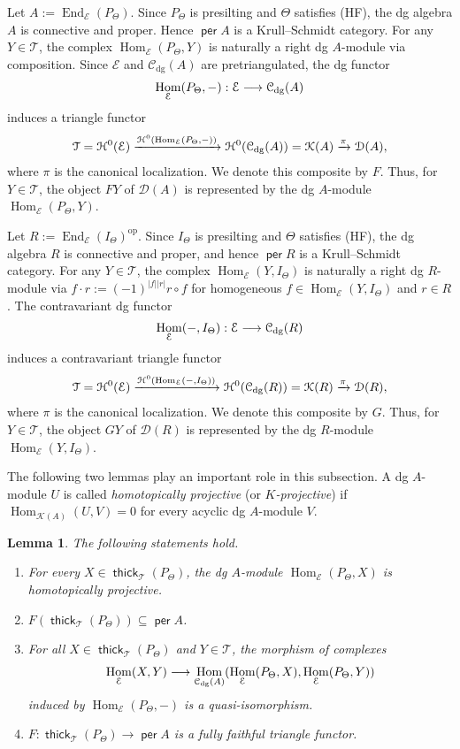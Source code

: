 \documentclass[a4paper,reqno,11pt]{amsart}
\numberwithin{equation}{section}
\newtheorem{lemma}[theorem]{Lemma}
\theoremstyle{definition}
\newcommand{\C}{\mathcal{C}}
\newcommand{\D}{\mathcal{D}}
\newcommand{\E}{\mathcal{E}}
\renewcommand{\H}{\mathcal{H}}
\newcommand{\K}{\mathcal{K}}
\newcommand{\T}{\mathcal{T}}
\newcommand{\bte}{\Theta}
\newcommand{\lto}{\longrightarrow}
\newcommand{\op}{\mathrm{op}}
\DeclareMathOperator{\thick}{\mathsf{thick}}
\DeclareMathOperator{\per}{\mathsf{per}}
\DeclareMathOperator{\End}{End}
\DeclareMathOperator{\Hom}{Hom}
\newcommand{\dgmod}{\C_{\mathrm{dg}}}
\begin{document}
Let $A:=\End_{\E}(P_{\bte})$.
Since $P_{\bte}$ is presilting and $\bte$ satisfies (HF), the dg algebra $A$ is connective and proper.
Hence $\per A$ is a Krull--Schmidt category.
For any $Y\in\T$, the complex $\Hom_{\E}(P_{\bte},Y)$ is naturally a right dg $A$-module via composition.
Since $\E$ and $\dgmod(A)$ are pretriangulated, the dg functor
\begin{align}
\Hom_{\E}(P_{\bte},-):\E\longrightarrow\dgmod(A)\notag
\end{align}
induces a triangle functor
\begin{align}
\T=\H^{0}(\E) \xrightarrow{\H^{0}(\Hom_{\E}(P_{\bte},-))} \H^{0}(\dgmod(A))=\K(A)\xrightarrow{\pi}\D(A),\notag
\end{align}
where $\pi$ is the canonical localization.
We denote this composite by $F$.
Thus, for $Y\in\T$, the object $FY$ of $\D(A)$ is represented by the dg $A$-module $\Hom_{\E}(P_{\bte},Y)$.

Let $R:=\End_{\E}(I_{\bte})^{\op}$.
Since $I_{\bte}$ is presilting and $\bte$ satisfies (HF), the dg algebra $R$ is connective and proper, and hence $\per R$ is a Krull--Schmidt category.
For any $Y\in\T$, the complex $\Hom_{\E}(Y,I_{\bte})$ is naturally a right dg $R$-module via $f\cdot r:=(-1)^{|f||r|}r\circ f$ for homogeneous $f\in\Hom_{\E}(Y,I_{\bte})$ and $r\in R$.
The contravariant dg functor
\begin{align}
\Hom_{\E}(-,I_{\bte}):\E\longrightarrow\dgmod(R)\notag
\end{align}
induces a contravariant triangle functor
\begin{align}
\T=\H^{0}(\E) \xrightarrow{\H^{0}(\Hom_{\E}(-,I_{\bte}))} \H^{0}(\dgmod(R))=\K(R)\xrightarrow{\pi}\D(R),\notag
\end{align}
where $\pi$ is the canonical localization.
We denote this composite by $G$.
Thus, for $Y\in\T$, the object $GY$ of $\D(R)$ is represented by the dg $R$-module $\Hom_{\E}(Y,I_{\bte})$.

The following two lemmas play an important role in this subsection.
A dg $A$-module $U$ is called \emph{homotopically projective} (or \emph{$K$-projective}) if $\Hom_{\K(A)}(U,V)=0$ for every acyclic dg $A$-module $V$.

\begin{lemma}\label{lem:Yoneda}
The following statements hold.
\begin{enumerate}
\item For every $X\in\thick_{\T}(P_{\bte})$, the dg $A$-module $\Hom_{\E}(P_{\bte},X)$ is homotopically projective.
\item $F(\thick_{\T}(P_{\bte}))\subseteq\per A$.
\item For all $X\in\thick_{\T}(P_{\bte})$ and $Y\in\T$, the morphism of complexes
\begin{align}
\Hom_{\E}(X,Y)\lto\Hom_{\dgmod(A)}(\Hom_{\E}(P_{\bte},X),\Hom_{\E}(P_{\bte},Y))\notag
\end{align}
induced by $\Hom_{\E}(P_{\bte},-)$ is a quasi-isomorphism.
\item $F:\thick_{\T}(P_{\bte})\to\per A$ is a fully faithful triangle functor.
\end{enumerate}
\end{lemma}
\end{document}
